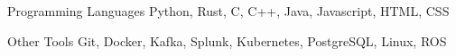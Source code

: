 


\begin{cvskills}


\cvskill
{Programming Languages} %
{Python, Rust, C, C++, Java, Javascript, HTML, CSS} %


\cvskill
{Other Tools} %
{Git, Docker, Kafka, Splunk, Kubernetes, PostgreSQL, Linux, ROS} %


\end{cvskills}
